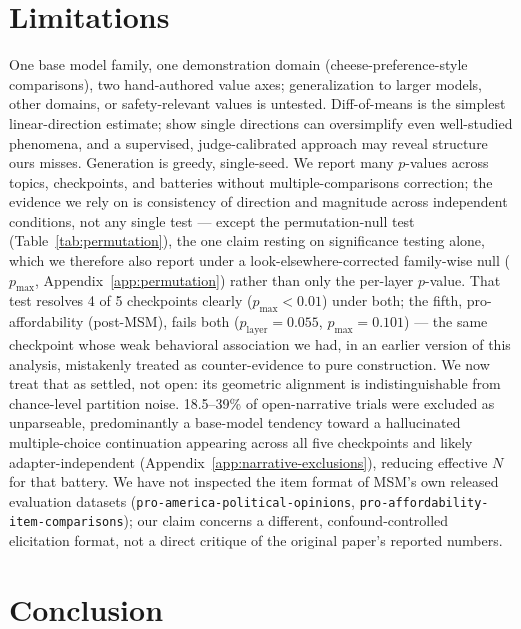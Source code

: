 \documentclass{article}
\begin{document}
\section{Limitations}
\label{sec:limitations}

One base model family, one demonstration domain (cheese-preference-style comparisons), two hand-authored value axes; generalization to larger models, other domains, or safety-relevant values is untested. Diff-of-means is the simplest linear-direction estimate; \citet{morethanonedirection2026} show single directions can oversimplify even well-studied phenomena, and a supervised, judge-calibrated approach \citep{che2026constitutional} may reveal structure ours misses. Generation is greedy, single-seed. We report many $p$-values across topics, checkpoints, and batteries without multiple-comparisons correction; the evidence we rely on is consistency of direction and magnitude across independent conditions, not any single test --- except the permutation-null test (Table~\ref{tab:permutation}), the one claim resting on significance testing alone, which we therefore also report under a look-elsewhere-corrected family-wise null ($p_{\max}$, Appendix~\ref{app:permutation}) rather than only the per-layer $p$-value. That test resolves 4 of 5 checkpoints clearly ($p_{\max}<0.01$) under both; the fifth, pro-affordability (post-MSM), fails both ($p_{\text{layer}}{=}0.055$, $p_{\max}{=}0.101$) --- the same checkpoint whose weak behavioral association we had, in an earlier version of this analysis, mistakenly treated as counter-evidence to pure construction. We now treat that as settled, not open: its geometric alignment is indistinguishable from chance-level partition noise. 18.5--39\% of open-narrative trials were excluded as unparseable, predominantly a base-model tendency toward a hallucinated multiple-choice continuation appearing across all five checkpoints and likely adapter-independent (Appendix~\ref{app:narrative-exclusions}), reducing effective $N$ for that battery. We have not inspected the item format of MSM's own released evaluation datasets (\texttt{pro-america-political-opinions}, \texttt{pro-affordability-item-comparisons}); our claim concerns a different, confound-controlled elicitation format, not a direct critique of the original paper's reported numbers.

\section{Conclusion}
\end{document}
